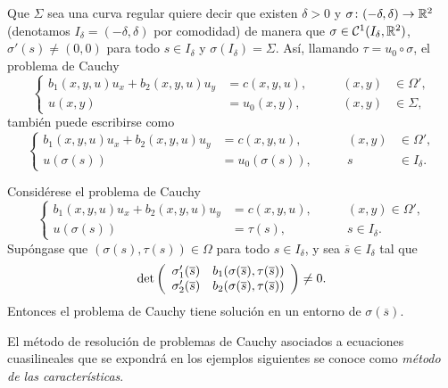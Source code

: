 \documentclass[a4paper, 12pt, extrafontsizes]{memoir}
\begin{document}
Que $\Sigma$ sea una curva regular quiere decir que existen $\delta > 0$ y $\sigma \colon (-\delta,\delta) \to \mathbb R^2$ (denotamos $I_\delta = (-\delta,\delta)$ por comodidad) de manera que $\sigma \in \mathcal{C}^1(I_\delta,\mathbb R^2)$, $\sigma'(s) \neq (0,0)$ para todo $s \in I_\delta$ y $\sigma(I_\delta) = \Sigma$. Así, llamando $\tau = u_0 \circ \sigma$, el problema de Cauchy
\[
    \left\{\begin{alignedat}{3}
        b_1(x,y,u)u_x+b_2(x,y,u)u_y &= c(x,y,u), \qquad & (x,y) &\in \Omega', \\
        u(x,y) &= u_0(x,y), \qquad & (x,y) &\in \Sigma,
    \end{alignedat}\right.
\]
también puede escribirse como
\[
    \left\{\begin{alignedat}{3}
        b_1(x,y,u)u_x+b_2(x,y,u)u_y &= c(x,y,u), \qquad & (x,y) &\in \Omega', \\
        u(\sigma(s)) &= u_0 (\sigma(s)), \qquad & s &\in I_\delta.
    \end{alignedat}\right.
\]

\begin{theorem}
    Considérese el problema de Cauchy
    \[
    \left\{\begin{alignedat}{2}
        b_1(x,y,u)u_x+b_2(x,y,u)u_y &= c(x,y,u), \qquad & (x,y) \in \Omega', \\
        u(\sigma(s)) &= \tau(s), \qquad & s \in I_\delta.
    \end{alignedat}\right.
    \]
    Supóngase que $(\sigma(s),\tau(s)) \in \Omega$ para todo $s \in I_\delta$, y sea $\overline{s} \in I_\delta$ tal que
    \[\textup{det}\left(
        \begin{array}{cc}
            \sigma_1'(\overline{s}) & b_1(\sigma(\overline{s}),\tau(\overline{s})) \\
            \sigma_2'(\overline{s}) & b_2(\sigma(\overline{s}),\tau(\overline{s}))
        \end{array}
    \right) \neq 0.\]
    Entonces el problema de Cauchy tiene solución en un entorno de $\sigma(\overline{s})$.  
\end{theorem}

El método de resolución de problemas de Cauchy asociados a ecuaciones cuasilineales que se expondrá en los ejemplos siguientes se conoce como \emph{método de las características}.
\end{document}
